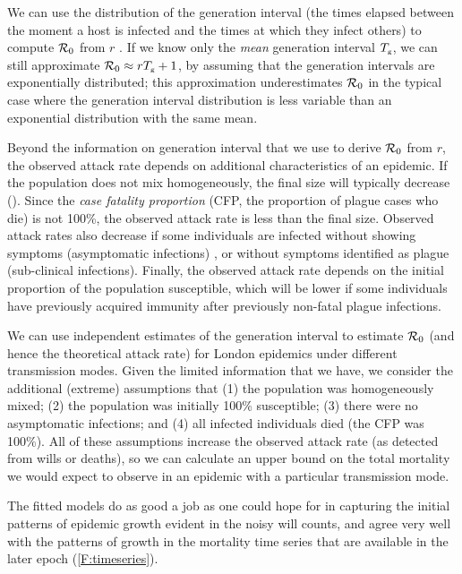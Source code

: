 We can use the distribution of the generation interval (the times elapsed between the moment a host is infected and the times at which they infect others) to compute ${\mathcal R}_0$ from $r$ \cite{WallLips07}. If we know only the \emph{mean} generation interval $T_{\mbox{\tiny g}}$, we can still approximate ${\mathcal R}_0 \approx r T_{\mbox{\tiny g}} +1$, by assuming that the generation intervals are exponentially distributed; this approximation underestimates ${\mathcal R}_0$ in the typical case where the generation interval distribution is less variable than an exponential distribution with the same mean.

Beyond the information on generation interval that we use to derive ${\mathcal R}_0$ from $r$, the observed attack rate depends on additional characteristics of an epidemic. If the population does not mix homogeneously, the final size will typically decrease (\eg \cite[Fig.\,6]{Roll+15}). Since the \emph{case fatality proportion} (CFP, the proportion of plague cases who die) is not 100\%, the observed attack rate is less than the final size. Observed attack rates also decrease if some individuals are infected without showing symptoms (asymptomatic infections) \cite{Mars+67}, or without symptoms identified as plague (sub-clinical infections). Finally, the observed attack rate depends on the initial proportion of the population susceptible, which will be lower if some individuals have previously acquired immunity after previously non-fatal plague infections. 

We can use independent estimates of the generation interval to estimate ${\mathcal R}_0$ (and hence the theoretical attack rate) for London epidemics under different transmission modes.  Given the limited information that we have, we consider the additional (extreme) assumptions that \hypertarget{4assumptions}{} (1) the population was homogeneously mixed; (2) the population was initially 100\% susceptible; (3) there were no asymptomatic infections; and (4) all infected individuals died (\ie the CFP was 100\%). All of these assumptions increase the observed attack rate (as detected from wills or deaths), so we can calculate an upper bound on the total mortality we would expect to observe in an epidemic with a particular transmission mode.


The fitted models do as good a job as one could hope for in capturing the initial patterns of epidemic growth evident in the noisy will counts, and agree very well with the patterns of growth in the mortality time series that are available in the later epoch (\cref{F:timeseries}).

